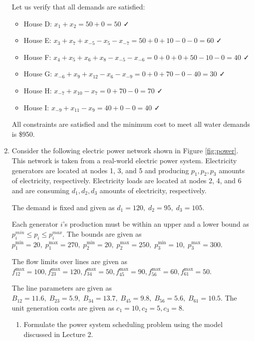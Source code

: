 \documentclass[11pt]{article}
\begin{document}
\begin{enumerate}
Let us verify that all demands are satisfied:
\begin{itemize}
    \item House D: $x_1 + x_2 = 50 + 0 = 50$ ✓
    \item House E: $x_3 + x_7 + x_{-5} - x_5 - x_{-7} = 50 + 0 + 10 - 0 - 0 = 60$ ✓  
    \item House F: $x_4 + x_5 + x_6 + x_8 - x_{-5} - x_{-6} = 0 + 0 + 0 + 50 - 10 - 0 = 40$ ✓
    \item House G: $x_{-6} + x_9 + x_{12} - x_6 - x_{-9} = 0 + 0 + 70 - 0 - 40 = 30$ ✓
    \item House H: $x_{-7} + x_{10} - x_7 = 0 + 70 - 0 = 70$ ✓
    \item House I: $x_{-9} + x_{11} - x_9 = 40 + 0 - 0 = 40$ ✓
\end{itemize}

All constraints are satisfied and the minimum cost to meet all water demands is \$950.

	\newpage
	\item Consider the following electric power network shown in Figure \ref{fig:power}. This network is taken from a real-world electric power system. Electricity generators are located at nodes 1, 3, and 5 and producing $p_1, p_2, p_3$ amounts of electricity, respectively. Electricity loads are located at nodes 2, 4, and 6 and are consuming $d_1, d_2, d_3$ amounts of electricity, respectively. 
	
	The demand is fixed and given as $d_1 = 120, \; d_2 = 95, \; d_3 = 105$.
	
	Each generator $i$'s production must be within an upper and a lower bound as $p_i^{min}\le p_i \le p_i^{max}$. The bounds are given as $p_1^{\text{min}} = 20, \; p_1^{\text{max}} = 270,\; p_2^{\text{min}} = 20,\; p_2^{\text{max}} = 250, \; p_3^{\text{min}} = 10, \; p_3^{\text{max}} = 300$. 
	
	The flow limits over lines are given as $f_{12}^{\text{max}} = 100, f_{23}^{\text{max}} = 120, f_{34}^{\text{max}} = 50, f_{45}^{\text{max}} = 90, f_{56}^{\text{max}} = 60, f_{61}^{\text{max}} = 50$. 
	
	The line parameters are given as $B_{12} = 11.6, \; B_{23} = 5.9, \; B_{34} = 13.7, \; B_{45} = 9.8, \; B_{56} = 5.6, \; B_{61} = 10.5$. The unit generation costs are given as $c_1 = 10, c_2 = 5, c_3 = 8$.
	
	\begin{enumerate}
		\item Formulate the power system scheduling problem using the model discussed in Lecture 2. 
		

\end{enumerate}
\end{enumerate}
\end{document}
